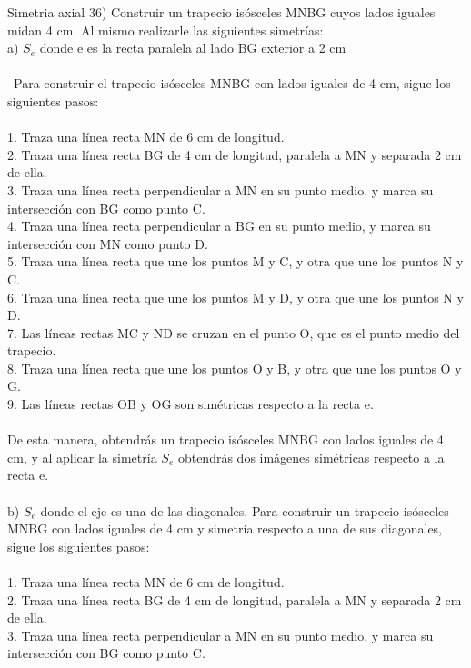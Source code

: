 \documentclass{article}
\begin{document}
{\large Simetria axial}
36) Construir un trapecio isósceles MNBG cuyos lados iguales midan 4 cm. Al mismo realizarle las siguientes simetrías: \\
a) $S_e$ donde e es la recta paralela al lado BG exterior a 2 cm \\ \\\ 
Para construir el trapecio isósceles MNBG con lados iguales de 4 cm, sigue los siguientes pasos:\\
\\
1. Traza una línea recta MN de 6 cm de longitud.\\
2. Traza una línea recta BG de 4 cm de longitud, paralela a MN y separada 2 cm de ella.\\
3. Traza una línea recta perpendicular a MN en su punto medio, y marca su intersección con BG como punto C.\\
4. Traza una línea recta perpendicular a BG en su punto medio, y marca su intersección con MN como punto D.\\
5. Traza una línea recta que une los puntos M y C, y otra que une los puntos N y C.\\
6. Traza una línea recta que une los puntos M y D, y otra que une los puntos N y D.\\
7. Las líneas rectas MC y ND se cruzan en el punto O, que es el punto medio del trapecio.\\
8. Traza una línea recta que une los puntos O y B, y otra que une los puntos O y G.\\
9. Las líneas rectas OB y OG son simétricas respecto a la recta e.\\
\\
De esta manera, obtendrás un trapecio isósceles MNBG con lados iguales de 4 cm, y al aplicar la simetría $S_e$ obtendrás dos imágenes simétricas respecto a la recta e.\\
\\
b) $S_e$ donde el eje es una de las diagonales.
Para construir un trapecio isósceles MNBG con lados iguales de 4 cm y simetría respecto a una de sus diagonales, sigue los siguientes pasos:\\
\\
1. Traza una línea recta MN de 6 cm de longitud.\\
2. Traza una línea recta BG de 4 cm de longitud, paralela a MN y separada 2 cm de ella.\\
3. Traza una línea recta perpendicular a MN en su punto medio, y marca su intersección con BG como punto C.\\
\end{document}
